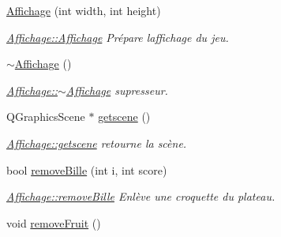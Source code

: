 \begin{DoxyCompactItemize}
\item 
\hyperlink{class_affichage_ac399c69d87add454bf6e2843048469f9}{Affichage} (int width, int height)
\begin{DoxyCompactList}\small\item\em \hyperlink{class_affichage_ac399c69d87add454bf6e2843048469f9}{Affichage\+::\+Affichage} Prépare l\textquotesingle{}affichage du jeu. \end{DoxyCompactList}\item 
\hypertarget{class_affichage_ae6a4f4db7a0d8d2abc8bd44c1be674c0}{}\hyperlink{class_affichage_ae6a4f4db7a0d8d2abc8bd44c1be674c0}{$\sim$\+Affichage} ()\label{class_affichage_ae6a4f4db7a0d8d2abc8bd44c1be674c0}

\begin{DoxyCompactList}\small\item\em \hyperlink{class_affichage_ae6a4f4db7a0d8d2abc8bd44c1be674c0}{Affichage\+::$\sim$\+Affichage} supresseur. \end{DoxyCompactList}\item 
Q\+Graphics\+Scene $\ast$ \hyperlink{class_affichage_aca084a5b0f8a5bcb022f6dec830a61c3}{getscene} ()
\begin{DoxyCompactList}\small\item\em \hyperlink{class_affichage_aca084a5b0f8a5bcb022f6dec830a61c3}{Affichage\+::getscene} retourne la scène. \end{DoxyCompactList}\item 
bool \hyperlink{class_affichage_a33345ff86466d7bde09c9cbfea1eebe8}{remove\+Bille} (int i, int score)
\begin{DoxyCompactList}\small\item\em \hyperlink{class_affichage_a33345ff86466d7bde09c9cbfea1eebe8}{Affichage\+::remove\+Bille} Enlève une croquette du plateau. \end{DoxyCompactList}\item 
\hypertarget{class_affichage_acfd56bc872936e15ce091ab2b40c0772}{}void \hyperlink{class_affichage_acfd56bc872936e15ce091ab2b40c0772}{remove\+Fruit} ()\label{class_affichage_acfd56bc872936e15ce091ab2b40c0772}


\end{DoxyCompactItemize}
